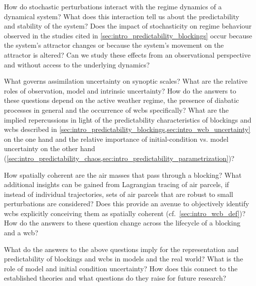 \begin{description}[
    ]
    \item[\textbf{\Cref{ch:stochasticInertia}}] How do stochastic perturbations interact with the regime dynamics of a
          dynamical system? What does this interaction tell us about the
          predictability and stability of the system? Does the impact of
          stochasticity on regime behaviour observed in the studies cited in
          \cref{sec:intro_predictability_blockings}
          occur because the system's attractor changes or because the system's
          movement on the attractor is altered? Can we study these effects
          from an observational perspective and without access to the underlying
          dynamics?
    \item[\textbf{\Cref{ch:weatherRegimes}}] What governs assimilation uncertainty on synoptic scales? What are
          the relative roles of observation, model and intrinsic uncertainty? How do
          the answers to these questions depend on the active weather regime,
          the presence of diabatic processes in general and  the occurrence of
          \glspl{wcb} specifically? What are the implied repercussions in light of
          the predictability characteristics of blockings and \glspl{wcb} described
          in \cref{sec:intro_predictability_blockings,sec:intro_wcb_uncertainty} on
          the one hand and the relative importance of initial-condition vs. model
          uncertainty on the other hand (\cref{sec:intro_predictability_chaos,sec:intro_predictability_parametrization})?
    \item[\textbf{\Cref{ch:coherence}}] How spatially coherent are the air masses that pass through a
          blocking? What additional insights can be gained from Lagrangian
          tracing of air parcels, if instead of individual trajectories,
          sets of air parcels that are robust to small perturbations are
          considered? Does this provide an avenue to
          objectively identify \glspl{wcb} explicitly conceiving them as spatially
          coherent (cf.~\cref{sec:intro_wcb_def})? How do the answers to these question change across the
          lifecycle of a blocking and a \gls{wcb}?
    \item[\textbf{\Cref{ch:conclusion}}] What do the answers to the above questions imply for the
          representation and predictability of blockings and \glspl{wcb} in models
          and the real world? What is the role of model and initial condition
          uncertainty? How does this connect to the established theories and
          what questions do they raise for future research?
\end{description}

